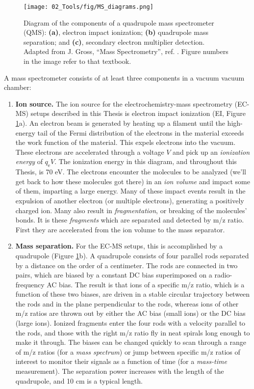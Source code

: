 \begin{figure}[h!]
	\texttt{[image: 02\_Tools/fig/MS\_diagrams.png]}
	\caption{Diagram of the components of a quadrupole mass spectrometer (QMS): \textbf{(a)}, electron impact ionization; \textbf{(b)} quadrupole mass separation; and \textbf{(c)},  secondary electron multiplier detection. Adapted from J. Gross, ``Mass Spectrometry'', ref. . Figure numbers in the image refer to that textbook.}
	\label{fig:MS}
\end{figure}

A mass spectrometer consists of at least three components in a vacuum vacuum chamber\cite{Gross2007}: 

\begin{enumerate}
	\item \textbf{Ion source.} The ion source for the electrochemistry-mass spectrometry (EC-MS) setups described in this Thesis is electron impact ionization (EI, Figure \ref{fig:MS}a). An electron beam is generated by heating up a filament until the high-energy tail of the Fermi distribution of the electrons in the material exceeds the work function of the material. This expels electrons into the vacuum. These electrons are accelerated through a voltage $V$ and pick up an \textit{ionization energy} of $q_\text{e}V$. The ionization energy in this diagram, and throughout this Thesis, is 70 eV. The electrons encounter the molecules to be analyzed (we'll get back to how these molecules got there) in an \textit{ion volume} and impact some of them, imparting a large energy. Many of these impact events result in the expulsion of another electron (or multiple electrons), generating a positively charged ion. Many also result in \textit{fragmentation}, or breaking of the molecules' bonds. It is these \textit{fragments} which are separated and detected by m/z ratio. First they are accelerated from the ion volume to the mass separator.
	
	\item \textbf{Mass separation.} For the EC-MS setups, this is accomplished by a quadrupole (Figure \ref{fig:MS}b). A quadrupole consists of four parallel rods separated by a distance on the order of a centimeter. The rods are connected in two pairs, which are biased by a constant DC bias superimposed on a radio-frequency AC bias. The result is that ions of a specific m/z ratio, which is a function of these two biases, are driven in a stable circular trajectory between the rods and in the plane perpendicular to the rods, whereas ions of other m/z ratios are thrown out by either the AC bias (small ions) or the DC bias (large ions). Ionized fragments enter the four rods with a velocity parallel to the rods, and those with the right m/z ratio fly in neat spirals long enough to make it through. The biases can be changed quickly to scan through a range of m/z ratios (for a \textit{mass spectrum}) or jump between specific m/z ratios of interest to monitor their signals as a function of time (for a \textit{mass-time} measurement). The separation power increases with the length of the quadrupole, and 10 cm is a typical length. 
	

\end{enumerate}

